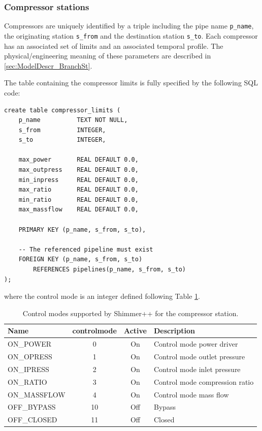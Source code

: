 \subsubsection{Compressor stations}
Compressors are uniquely identified by a triple including the pipe
name \texttt{p\_name}, the originating station \texttt{s\_from} and the destination
station \texttt{s\_to}. Each compressor has an associated set of limits and an
associated temporal profile.
The physical/engineering meaning of these parameters are described in \ref{sec:ModelDescr_BranchSt}. 

The table containing the compressor limits is fully specified by the following
SQL code:
\begin{verbatim}
create table compressor_limits (
    p_name          TEXT NOT NULL,
    s_from          INTEGER,
    s_to            INTEGER,

    max_power       REAL DEFAULT 0.0,
    max_outpress    REAL DEFAULT 0.0,
    min_inpress     REAL DEFAULT 0.0,
    max_ratio       REAL DEFAULT 0.0,
    min_ratio       REAL DEFAULT 0.0,
    max_massflow    REAL DEFAULT 0.0,

    PRIMARY KEY (p_name, s_from, s_to),

    -- The referenced pipeline must exist
    FOREIGN KEY (p_name, s_from, s_to)
        REFERENCES pipelines(p_name, s_from, s_to)
);
\end{verbatim}
where the control mode is an integer defined following Table \ref{tab:compressor:controlmode}. 
\begin{table}[H]
    \centering
    \begin{tabular}{lccl}
    \hline 
    Name & controlmode & Active &Description 
    \\ \hline
    ON\_POWER    & 0 &  On& Control mode power driver \\
    ON\_OPRESS   & 1 &  On& Control mode outlet pressure \\
    ON\_IPRESS   & 2 &  On& Control mode inlet pressure \\
    ON\_RATIO    & 3  &  On& Control mode compression ratio \\ 
    ON\_MASSFLOW & 4  &  On& Control mode mass flow \\
    OFF\_BYPASS  & 10 & Off& Bypass \\ 
    OFF\_CLOSED  & 11 & Off& Closed \\ \hline
    \end{tabular}
    \caption{Control modes supported by Shimmer++ for the compressor station.}
    \label{tab:compressor:controlmode}
\end{table}
